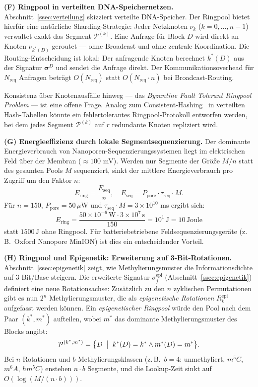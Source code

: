 ﻿\documentclass[a4paper,12pt]{article}
\theoremstyle{definition}
\theoremstyle{plain}
\begin{document}
\textbf{(F) Ringpool in verteilten DNA-Speichernetzen.}
Abschnitt~\ref{ssec:verteilung} skizziert verteilte DNA-Speicher.
Der Ringpool bietet hierfür eine natürliche Sharding-Strategie:
Jeder Netzknoten $\nu_k$ ($k = 0, \ldots, n-1$) verwaltet exakt das
Segment $\mathcal{P}^{(k)}$.  Eine Anfrage für Block $D$ wird direkt
an Knoten $\nu_{k^*(D)}$ geroutet --- ohne Broadcast und ohne zentrale
Koordination.  Die Routing-Entscheidung ist lokal: Der anfragende Knoten
berechnet $k^*(D)$ aus der Signatur $\boldsymbol{\sigma}^D$ und sendet
die Anfrage direkt.  Der Kommunikationsoverhead für $N_{\mathrm{req}}$
Anfragen beträgt $O(N_{\mathrm{req}})$ statt $O(N_{\mathrm{req}} \cdot n)$
bei Broadcast-Routing.

Konsistenz über Knotenausfälle hinweg --- das \emph{Byzantine Fault
Tolerant Ringpool Problem} --- ist eine offene Frage.  Analog zum
Consistent-Hashing~\cite{karger1997} in verteilten Hash-Tabellen könnte
ein fehlertolerantes Ringpool-Protokoll entworfen werden, bei dem jedes
Segment $\mathcal{P}^{(k)}$ auf $r$ redundante Knoten repliziert wird.

\textbf{(G) Energieeffizienz durch lokale Segmentsequenzierung.}
Der dominante Energieverbrauch von Nanoporen-Sequenzierungssystemen
liegt im elektrischen Feld über der Membran ($\approx 100$ mV).  Werden
nur Segmente der Größe $M/n$ statt des gesamten Pools $M$ sequenziert,
sinkt der mittlere Energieverbrauch pro Zugriff um den Faktor $n$:
\[
  E_{\mathrm{ring}} = \frac{E_{\mathrm{seq}}}{n},
  \quad E_{\mathrm{seq}} = P_{\mathrm{pore}} \cdot \tau_{\mathrm{seq}} \cdot M.
\]
Für $n = 150$, $P_{\mathrm{pore}} = 50\,\mu$W und
$\tau_{\mathrm{seq}} \cdot M = 3 \times 10^{10}$ ms ergibt sich:
\[
  E_{\mathrm{ring}} = \frac{50 \times 10^{-6}\,\text{W} \cdot 3 \times 10^7\,\text{s}}{150}
  = 10^1\,\text{J} = 10\,\text{Joule}
\]
statt $1500\,\text{J}$ ohne Ringpool.  Für batteriebetriebene
Feldsequenzierungsgeräte (z.\,B.\ Oxford Nanopore MinION) ist dies ein
entscheidender Vorteil.

\textbf{(H) Ringpool und Epigenetik: Erweiterung auf 3-Bit-Rotationen.}
Abschnitt~\ref{ssec:epigenetik} zeigt, wie Methylierungsmuster die
Informationsdichte auf $3$ Bit/Base steigern.  Die erweiterte
Signatur $\sigma_j^{\mathrm{epi}}$ (Abschnitt~\ref{ssec:epigenetik})
definiert eine neue Rotationsachse: Zusätzlich zu den $n$ zyklischen
Permutationen gibt es nun $2^n$ Methylierungsmuster, die als
\emph{epigenetische Rotationen} $R_k^{\mathrm{epi}}$ aufgefasst werden
können.  Ein \emph{epigenetischer Ringpool} würde den Pool nach dem
Paar $(k^*, m^*)$ aufteilen, wobei $m^*$ das dominante Methylierungsmuster
des Blocks angibt:
\[
  \mathcal{P}^{(k^*, m^*)} = \bigl\{D \;\bigm|\;
    k^*(D) = k^* \wedge m^*(D) = m^*\bigr\}.
\]
Bei $n$ Rotationen und $b$ Methylierungsklassen (z.\,B.\ $b = 4$:
unmethyliert, $m^5C$, $m^6A$, $hm^5C$) enstehen $n \cdot b$ Segmente,
und die Lookup-Zeit sinkt auf $O(\log(M/(n \cdot b)))$.
\end{document}
